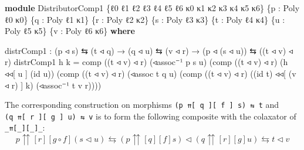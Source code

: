 \documentclass[
  11pt,
  oneside,
  article]{memoir}
\newenvironment{Shaded}{}{}
\newcommand{\KeywordTok}[1]{\textcolor[rgb]{0.00,0.44,0.13}{\textbf{#1}}}
\newcommand{\NormalTok}[1]{#1}
\newcommand{\OtherTok}[1]{\textcolor[rgb]{0.00,0.44,0.13}{#1}}
\theoremstyle{definition}
\theoremstyle{plain}
\newcommand{\0}{\textsf{0}}
\newcommand{\1}{\tn{\textsf{1}}}
\begin{document}
\begin{Shaded}
\begin{Highlighting}[]
\KeywordTok{module}\NormalTok{ DistributorComp1 }\OtherTok{\{}\NormalTok{ℓ0 ℓ1 ℓ2 ℓ3 ℓ4 ℓ5 ℓ6 κ0 κ1 κ2 κ3 κ4 κ5 κ6}\OtherTok{\}}
                        \OtherTok{\{}\NormalTok{p }\OtherTok{:}\NormalTok{ Poly ℓ0 κ0}\OtherTok{\}} \OtherTok{\{}\NormalTok{q }\OtherTok{:}\NormalTok{ Poly ℓ1 κ1}\OtherTok{\}} \OtherTok{\{}\NormalTok{r }\OtherTok{:}\NormalTok{ Poly ℓ2 κ2}\OtherTok{\}}
                        \OtherTok{\{}\NormalTok{s }\OtherTok{:}\NormalTok{ Poly ℓ3 κ3}\OtherTok{\}} \OtherTok{\{}\NormalTok{t }\OtherTok{:}\NormalTok{ Poly ℓ4 κ4}\OtherTok{\}}
                        \OtherTok{\{}\NormalTok{u }\OtherTok{:}\NormalTok{ Poly ℓ5 κ5}\OtherTok{\}} \OtherTok{\{}\NormalTok{v }\OtherTok{:}\NormalTok{ Poly ℓ6 κ6}\OtherTok{\}} \KeywordTok{where}

\NormalTok{    distrComp1 }\OtherTok{:} \OtherTok{(}\NormalTok{p ◃ s}\OtherTok{)}\NormalTok{ ⇆ }\OtherTok{(}\NormalTok{t ◃ q}\OtherTok{)} \OtherTok{→} \OtherTok{(}\NormalTok{q ◃ u}\OtherTok{)}\NormalTok{ ⇆ }\OtherTok{(}\NormalTok{v ◃ r}\OtherTok{)}
                 \OtherTok{→} \OtherTok{(}\NormalTok{p ◃ }\OtherTok{(}\NormalTok{s ◃ u}\OtherTok{))}\NormalTok{ ⇆ }\OtherTok{((}\NormalTok{t ◃ v}\OtherTok{)}\NormalTok{ ◃ r}\OtherTok{)}
\NormalTok{    distrComp1 h k }\OtherTok{=} 
\NormalTok{        comp }\OtherTok{((}\NormalTok{t ◃ v}\OtherTok{)}\NormalTok{ ◃ r}\OtherTok{)} \OtherTok{(}\NormalTok{◃assoc⁻¹ p s u}\OtherTok{)} 
             \OtherTok{(}\NormalTok{comp }\OtherTok{((}\NormalTok{t ◃ v}\OtherTok{)}\NormalTok{ ◃ r}\OtherTok{)} \OtherTok{(}\NormalTok{h ◃◃[ u ] }\OtherTok{(}\NormalTok{id u}\OtherTok{))} 
                   \OtherTok{(}\NormalTok{comp }\OtherTok{((}\NormalTok{t ◃ v}\OtherTok{)}\NormalTok{ ◃ r}\OtherTok{)} \OtherTok{(}\NormalTok{◃assoc t q u}\OtherTok{)} 
                         \OtherTok{(}\NormalTok{comp }\OtherTok{((}\NormalTok{t ◃ v}\OtherTok{)}\NormalTok{ ◃ r}\OtherTok{)} \OtherTok{((}\NormalTok{id t}\OtherTok{)}\NormalTok{ ◃◃[ }\OtherTok{(}\NormalTok{v ◃ r}\OtherTok{)}\NormalTok{ ] k}\OtherTok{)} 
                               \OtherTok{(}\NormalTok{◃assoc⁻¹ t v r}\OtherTok{))))}
\end{Highlighting}
\end{Shaded}

The corresponding construction on morphisms
\texttt{(p\ ⇈{[}\ q\ {]}{[}\ f\ {]}\ s)\ ⇆\ t} and
\texttt{(q\ ⇈{[}\ r\ {]}{[}\ g\ {]}\ u)\ ⇆\ v} is to form the following
composite with the colaxator of \texttt{\_⇈{[}\_{]}{[}\_{]}\_}: \[
p {\upuparrows}[r][g \circ f] (s \triangleleft u) \leftrightarrows (p {\upuparrows}[q][f] s) \triangleleft (q {\upuparrows}[r][g] u) \leftrightarrows t \triangleleft v
\]
\end{document}
